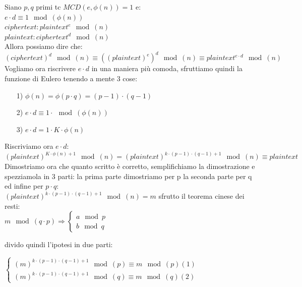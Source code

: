 \documentclass[10pt,a4paper]{article}
\begin{document}
Siano $p,q$ primi tc $MCD(e,\phi(n))=1$ e:\\
$e\cdot d \equiv 1 \mod(\phi(n))$\\
$ciphertext: plaintext^e \mod(n)$\\
$plaintext: ciphertext^d \mod(n)$\\
Allora possiamo dire che:
$(ciphertext)^d \mod(n) \equiv ((plaintext)^e)^d \mod(n) \equiv plaintext^{e\cdot d} \mod(n)$\\
Vogliamo ora riscrivere $e \cdot d$ in una maniera più comoda, sfruttiamo quindi la funzione di Eulero tenendo a mente 3 cose:\\
\begin{itemize}
\item[1)]$\phi(n) = \phi(p\cdot q) = (p-1)\cdot(q-1)$
\item[2)]$e\cdot d \equiv 1 \cdot \mod(\phi(n))$
\item[3)]$e\cdot d = 1 \cdot K\cdot \phi(n)$
\end{itemize}
Riscriviamo ora $e \cdot d$:\\
$(plaintext)^{K \cdot \phi(n)+1}\mod(n) = (plaintext)^{k\cdot(p-1)\cdot(q-1)+1}\mod(n)\equiv plaintext$\\
Dimostriamo ora che quanto scritto è corretto, semplifichiamo la dimostrazione e spezziamola in 3 parti: la prima parte dimostriamo per p la seconda parte per q ed infine per $p\cdot q$:\\
$(plaintext)^{k\cdot(p-1)\cdot(q-1)+1}\mod(n)=m$ sfrutto il teorema cinese dei resti:\\
$m\mod(q\cdot p) \Rightarrow \begin{cases}a\mod p \\b\mod q\end{cases}$

divido quindi l'ipotesi in due parti:
\begin{center}
$\begin{cases}
(m)^{k\cdot(p-1)\cdot(q-1)+1}\mod(p)\equiv m \mod(p) (1)\\
(m)^{k\cdot(p-1)\cdot(q-1)+1}\mod(q)\equiv m \mod(q) (2)
\end{cases}
$\\
\end{center}
\end{document}
